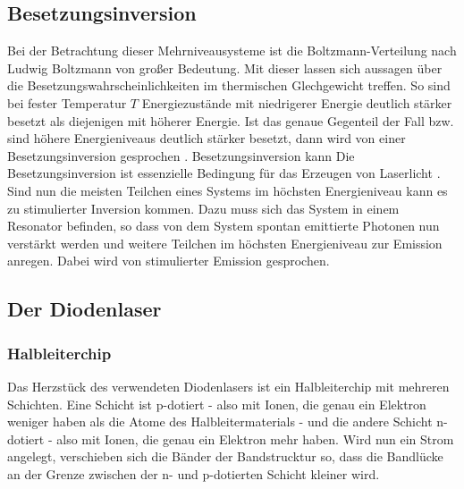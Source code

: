     \subsection{Besetzungsinversion}
    Bei der Betrachtung dieser Mehrniveausysteme ist die Boltzmann-Verteilung nach Ludwig Boltzmann von großer Bedeutung. Mit dieser lassen sich aussagen über die Besetzungswahrscheinlichkeiten im
    thermischen Glechgewicht treffen. So sind bei fester Temperatur $T$ Energiezustände mit niedrigerer Energie deutlich stärker besetzt als diejenigen mit höherer Energie. Ist das genaue Gegenteil
    der Fall bzw. sind höhere Energieniveaus deutlich stärker besetzt, dann wird von einer Besetzungsinversion gesprochen \cite[288]{moeller_2003}. Besetzungsinversion kann
    Die Besetzungsinversion ist essenzielle Bedingung für das Erzeugen von Laserlicht \cite[289]{moeller_2003}.
    \\
    Sind nun die meisten Teilchen eines Systems im höchsten Energieniveau kann es zu stimulierter Inversion kommen. Dazu muss sich das System in einem Resonator befinden, so dass von dem System spontan emittierte 
    Photonen nun verstärkt werden und weitere Teilchen im höchsten Energieniveau zur Emission anregen. Dabei wird von stimulierter Emission gesprochen.
   

    \subsection{Der Diodenlaser}
    \subsubsection{Halbleiterchip}
    \label{sec:halbleiterchip}
    Das Herzstück des verwendeten Diodenlasers ist ein Halbleiterchip mit mehreren Schichten. Eine Schicht ist p-dotiert - also mit Ionen, die genau ein Elektron weniger haben als die Atome des 
    Halbleitermaterials - und die andere Schicht n-dotiert - also mit Ionen, die genau ein Elektron mehr haben. Wird nun ein Strom angelegt, verschieben sich die Bänder der Bandstrucktur so, dass
    die Bandlücke an der Grenze zwischen der n- und p-dotierten Schicht kleiner wird.  
